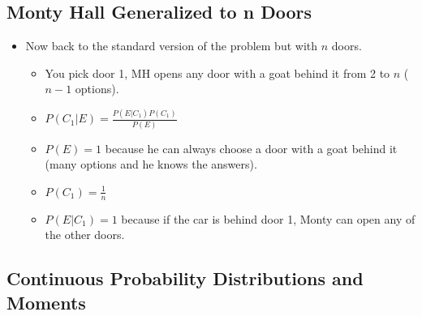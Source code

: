 \subsection{Monty Hall Generalized to n Doors}

\begin{itemize}
    \item Now back to the standard version of the problem but with $n$ doors.
          \begin{itemize}
              \item You pick door 1, MH opens any door with a goat behind it from 2 to $n$ ($n-1$ options).
              \item $P(C_1 | E) = \frac{P(E | C_1) P(C_1)}{P(E)}$
              \item $P(E) = 1$ because he can always choose a door with a goat behind it (many options and he knows the answers).
              \item $P(C_1) = \frac{1}{n}$
              \item $P(E | C_1) = 1$ because if the car is behind door 1, Monty can open any of the other doors.
          \end{itemize}
\end{itemize}

\subsection{Continuous Probability Distributions and Moments}

